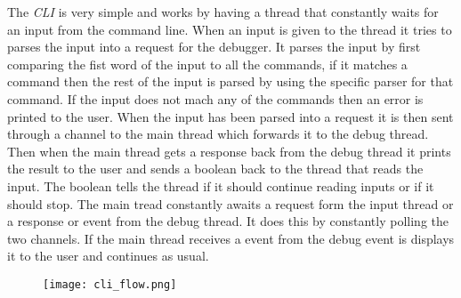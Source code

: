 The \emph{CLI} is very simple and works by having a thread that constantly waits for an input from the command line.
When an input is given to the thread it tries to parses the input into a request for the debugger.
It parses the input by first comparing the fist word of the input to all the commands, if it matches a command then the rest of the input is parsed by using the specific parser for that command.
If the input does not mach any of the commands then an error is printed to the user.
When the input has been parsed into a request it is then sent through a channel to the main thread which forwards it to the debug thread.
Then when the main thread gets a response back from the debug thread it prints the result to the user and sends a boolean back to the thread that reads the input.
The boolean tells the thread if it should continue reading inputs or if it should stop.
The main tread constantly awaits a request form the input thread or a response or event from the debug thread.
It does this by constantly polling the two channels.
If the main thread receives a event from the debug event is displays it to the user and continues as usual.


\begin{figure}[h]
    \centering
    \texttt{[image: cli\_flow.png]}
    \label{fig:cliflow}
\end{figure}

